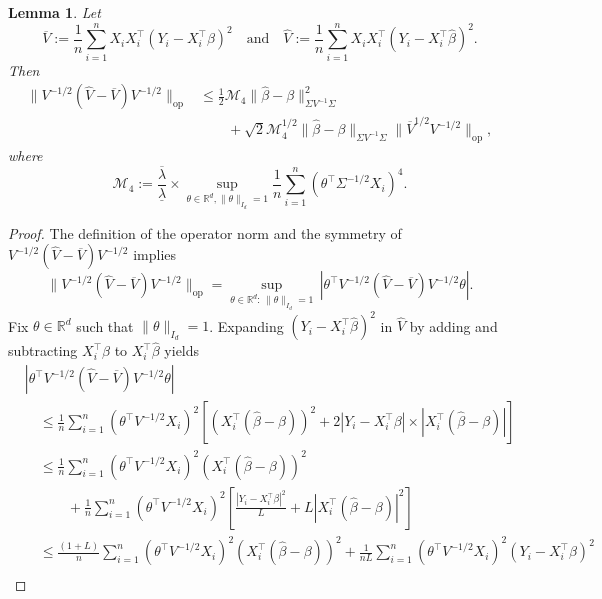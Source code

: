 \documentclass[11pt]{article}
\newtheorem{lemma}[theorem]{Lemma}
\begin{document}
\begin{appendices}
\begin{lemma}\label{lem:operator-norm-Vhat-Vbar}
Let
\[
\overline{V} := \frac{1}{n}\sum_{i=1}^n X_iX_i^{\top}(Y_i - X_i^{\top}\beta)^2\quad\mbox{and}\quad \widehat{V} := \frac{1}{n}\sum_{i=1}^n X_iX_i^{\top}(Y_i - X_i^{\top}\widehat{\beta})^2.
\]
Then
\begin{align*}
\|V^{-1/2}(\widehat{V} - \overline{V})V^{-1/2}\|_{\mathrm{op}} &\le \frac{1}{2}\mathcal{M}_4\|\widehat{\beta} - \beta\|_{\Sigma V^{-1}\Sigma}^2\\ &\qquad+ \sqrt{2}\mathcal{M}_4^{1/2}\|\widehat{\beta} - \beta\|_{\Sigma V^{-1}\Sigma}\|\overline{V}^{1/2}V^{-1/2}\|_{\mathrm{op}},
\end{align*}
where
\[
\mathcal{M}_4 := \frac{\overline{\lambda}}{\underline{\lambda}}\times\sup_{\theta\in\mathbb{R}^d,\|\theta\|_{I_d} = 1}\frac{1}{n}\sum_{i=1}^n (\theta^{\top}\Sigma^{-1/2}X_i)^4.
\]
\end{lemma}
\begin{proof}
The definition of the operator norm and the symmetry of $V^{-1/2}(\widehat{V} - \overline{V})V^{-1/2}$ implies
\[
\|V^{-1/2}(\widehat{V} - \overline{V})V^{-1/2}\|_{\mathrm{op}} = \sup_{\theta\in\mathbb{R}^d:\,\|\theta\|_{I_d} = 1}\,\left|\theta^{\top}V^{-1/2}(\widehat{V} - \overline{V})V^{-1/2}\theta\right|.
\]
Fix $\theta\in\mathbb{R}^d$ such that $\|\theta\|_{I_d} = 1$.
Expanding $(Y_i - X_i^{\top}\widehat{\beta})^2$ in $\widehat{V}$ by adding and subtracting $X_i^{\top}\beta$ to $X_i^{\top}\widehat{\beta}$ yields
\begin{align*}
&\left|{\theta^{\top}V^{-1/2}(\widehat{V} - \overline{V})V^{-1/2}\theta}\right|\\ 
&\quad\le \frac{1}{n}\sum_{i=1}^n {(\theta^{\top}V^{-1/2}X_i)^2}\left[(X_i^{\top}(\widehat{\beta} - \beta))^2 + 2|Y_i - X_i^{\top}\beta|\times|X_i^{\top}(\widehat{\beta} - \beta)|\right]\\
&\quad\le \frac{1}{n}\sum_{i=1}^n {(\theta^{\top}V^{-1/2}X_i)^2}(X_i^{\top}(\widehat{\beta} - \beta))^2\\ 
&\quad\qquad+ \frac{1}{n}\sum_{i=1}^n {(\theta^{\top}V^{-1/2}X_i)^2}\left[\frac{|Y_i - X_i^{\top}\beta|^2}{L} + L|X_i^{\top}(\widehat{\beta} - \beta)|^2\right]\\
&\quad\le \frac{(1 + L)}{n}\sum_{i=1}^n {(\theta^{\top}V^{-1/2}X_i)^2}(X_i^{\top}(\widehat{\beta} - \beta))^2 + \frac{1}{nL}\sum_{i=1}^n {(\theta^{\top}V^{-1/2}X_i)^2}(Y_i - X_i^{\top}\beta)^2\\

\end{align*}
\end{proof}
\end{appendices}
\end{document}
